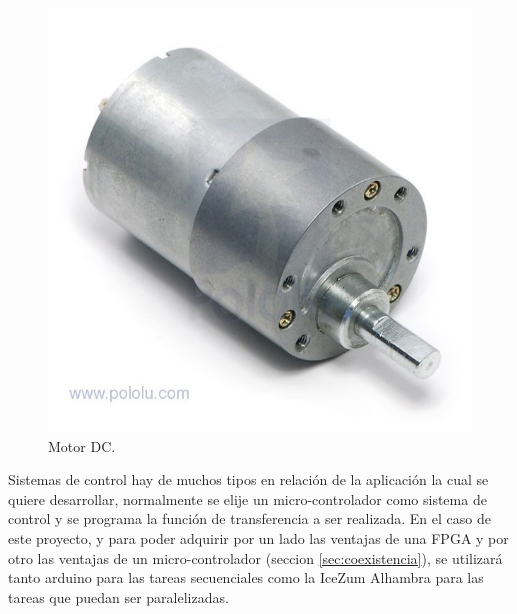 \begin{center}
	\begin{figure}[H]
		\center
		\includegraphics[scale=0.4]{imagenes/EstadoArte/motor.jpg}
		\caption{Motor DC.}
		\label{fig:motor_DC}
	\end{figure}
\end{center}


Sistemas de control hay de muchos tipos en relación de la aplicación la cual se quiere desarrollar, normalmente se elije un micro-controlador como sistema de control y se programa la función de transferencia a ser realizada.\newline
En el caso de este proyecto, y para poder adquirir por un lado las ventajas de una FPGA y por otro las ventajas de un micro-controlador (seccion \ref{sec:coexistencia}), se utilizará tanto arduino para las tareas secuenciales como la IceZum Alhambra para las tareas que puedan ser paralelizadas. \newline


